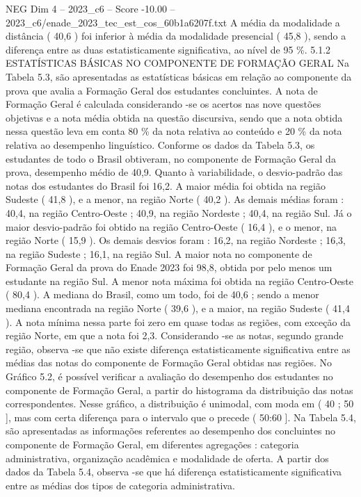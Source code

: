 \begin{textsample}{NEG Dim 4 – 2023\_c6 – Score -10.00 – 2023\_c6/enade\_2023\_tec\_est\_cos\_60b1a6207f.txt}
A média da modalidade a distância ( 40,6 ) foi inferior à média da modalidade presencial ( 45,8 ), sendo a diferença entre as duas estatisticamente significativa, ao nível de 95 \%. 5.1.2 ESTATÍSTICAS BÁSICAS NO COMPONENTE DE FORMAÇÃO GERAL Na Tabela 5.3, são apresentadas as estatísticas básicas em relação ao componente da prova que avalia a Formação Geral dos estudantes concluintes.
A nota de Formação Geral é calculada considerando -se os acertos nas nove questões objetivas e a nota média obtida na questão discursiva, sendo que a nota obtida nessa questão leva em conta 80 \% da nota relativa ao conteúdo e 20 \% da nota relativa ao desempenho linguístico.
Conforme os dados da Tabela 5.3, os estudantes de todo o Brasil obtiveram, no componente de Formação Geral da prova, desempenho médio de 40,9.
Quanto à variabilidade, o desvio-padrão das notas dos estudantes do Brasil foi 16,2.
A maior média foi obtida na região Sudeste ( 41,8 ), e a menor, na região Norte ( 40,2 ).
As demais médias foram : 40,4, na região Centro-Oeste ; 40,9, na região Nordeste ; 40,4, na região Sul.
Já o maior desvio-padrão foi obtido na região Centro-Oeste ( 16,4 ), e o menor, na região Norte ( 15,9 ).
Os demais desvios foram : 16,2, na região Nordeste ; 16,3, na região Sudeste ; 16,1, na região Sul.
A maior nota no componente de Formação Geral da prova do Enade 2023 foi 98,8, obtida por pelo menos um estudante na região Sul.
A menor nota máxima foi obtida na região Centro-Oeste ( 80,4 ).
A mediana do Brasil, como um todo, foi de 40,6 ; sendo a menor mediana encontrada na região Norte ( 39,6 ), e a maior, na região Sudeste ( 41,4 ).
A nota mínima nessa parte foi zero em quase todas as regiões, com exceção da região Norte, em que a nota foi 2,3.
Considerando -se as notas, segundo grande região, observa -se que não existe diferença estatisticamente significativa entre as médias das notas do componente de Formação Geral obtidas nas regiões.
No Gráfico 5.2, é possível verificar a avaliação do desempenho dos estudantes no componente de Formação Geral, a partir do histograma da distribuição das notas correspondentes.
Nesse gráfico, a distribuição é unimodal, com moda em ( 40 ; 50 ], mas com certa diferença para o intervalo que o precede ( 50:60 ].
Na Tabela 5.4, são apresentadas as informações referentes ao desempenho dos concluintes no componente de Formação Geral, em diferentes agregações : categoria administrativa, organização acadêmica e modalidade de oferta.
A partir dos dados da Tabela 5.4, observa -se que há diferença estatisticamente significativa entre as médias dos tipos de categoria administrativa.

\end{textsample}
